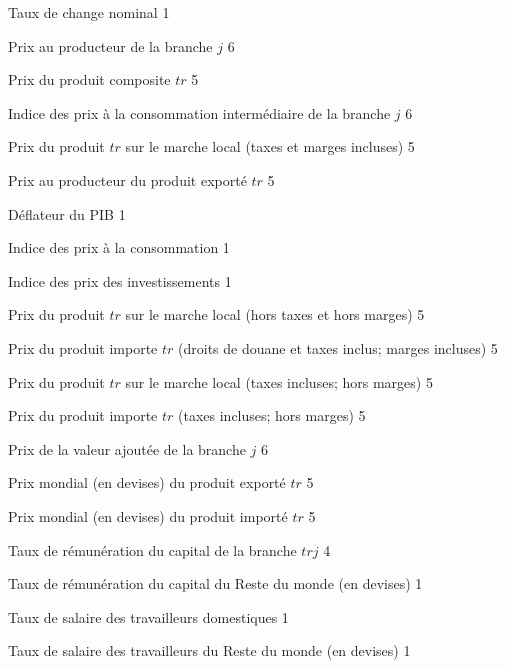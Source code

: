 \documentclass[11pt,a4paper]{article}
\newcommand{\tr}{\mathit{tr}}
\newcommand{\trj}{\mathit{trj}}
\newcommand{\PC}{\mathit{PC}}
\newcommand{\PCI}{\mathit{PCI}}
\newcommand{\PD}{\mathit{PD}}
\newcommand{\PE}{\mathit{PE}}
\newcommand{\PIXCON}{\mathit{PIXCON}}
\newcommand{\PIXINV}{\mathit{PIXINV}}
\newcommand{\PIXPIB}{\mathit{PIXPIB}}
\newcommand{\PL}{\mathit{PL}}
\newcommand{\PM}{\mathit{PM}}
\newcommand{\PPD}{\mathit{PPD}}
\newcommand{\PPM}{\mathit{PPM}}
\newcommand{\PVA}{\mathit{PVA}}
\newcommand{\PWE}{\mathit{PWE}}
\newcommand{\PWM}{\mathit{PWM}}
\begin{document}
	\begin{description}[leftmargin=!,labelwidth=\widthof{\bfseries AAAAAAAA},parsep=9.7pt]
		\item[$e$]			Taux de change nominal 					\hfill 1
		\item[$P_j$]		Prix au producteur de la branche $j$ 	\hfill 6
		\item[$\PC_{\tr}$]	Prix du produit composite $\tr$ 		\hfill 5
		\item[$\PCI_j$]		Indice des prix à la consommation intermédiaire de la branche $j$ 	\hfill 6
		\item[$\PD_{\tr}$]	Prix du produit $tr$ sur le marche local (taxes et marges incluses)	\hfill 5
		\item[$\PE_{\tr}$]	Prix au producteur du produit exporté $\tr$ 	\hfill 5
		\item[$\PIXPIB$]	Déflateur du PIB 								\hfill 1
		\item[$\PIXCON$]    Indice des prix à la consommation 				\hfill 1
		\item[$\PIXINV$]    Indice des prix des investissements				\hfill 1
		\item[$\PL_{\tr}$]	Prix du produit $\tr$ sur le marche local (hors taxes et hors marges)				\hfill 5
		\item[$\PM_{\tr}$]	Prix du produit importe $\tr$ (droits de douane et taxes inclus; marges incluses)	\hfill 5
		\item[$\PPD_{\tr}$]	Prix du produit $\tr$ sur le marche local (taxes incluses; hors marges)				\hfill 5
		\item[$\PPM_{\tr}$]	Prix du produit importe $\tr$ (taxes incluses; hors marges) \hfill 5
		\item[$\PVA_j$]		Prix de la valeur ajoutée de la branche $j$ 				\hfill 6
		\item[$\PWE_{\tr}$]	Prix mondial (en devises) du produit exporté $\tr$ 			\hfill 5
		\item[$\PWM_{\tr}$]	Prix mondial (en devises) du produit importé $\tr$ 			\hfill 5
		\item[$R_{\trj}$]	Taux de rémunération du capital de la branche $\trj$		\hfill 4
		\item[$R^R$]		Taux de rémunération du capital du Reste du monde (en devises) 		\hfill 1
		\item[$W$]			Taux de salaire des travailleurs domestiques						\hfill 1
		\item[$W^R$]		Taux de salaire des travailleurs du Reste du monde (en devises)		\hfill 1
	\end{description}
\end{document}
